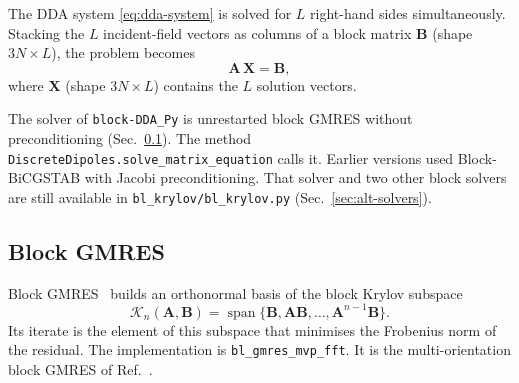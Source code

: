 \documentclass[11pt,a4paper]{article}
\begin{document}
The DDA system \eqref{eq:dda-system} is solved for $L$ right-hand sides
simultaneously.
Stacking the $L$ incident-field vectors as columns of a block matrix
$\mathbf{B}$ (shape $3N \times L$), the problem becomes
\begin{equation}
  \mathbf{A}\,\mathbf{X} = \mathbf{B},
  \label{eq:block-system}
\end{equation}
where $\mathbf{X}$ (shape $3N \times L$) contains the $L$ solution
vectors.

The solver of \texttt{block-DDA\_Py} is unrestarted block GMRES
without preconditioning (Sec.~\ref{sec:block-gmres}).
The method \texttt{DiscreteDipoles.solve\_matrix\_equation} calls it.
Earlier versions used Block-BiCGSTAB with Jacobi preconditioning.
That solver and two other block solvers are still available in
\texttt{bl\_krylov/bl\_krylov.py} (Sec.~\ref{sec:alt-solvers}).

\subsection{Block GMRES}
\label{sec:block-gmres}

Block GMRES~\cite{SaadSchultz1986,SimonciniGallopoulos1996} builds an
orthonormal basis of the block Krylov subspace
\begin{equation}
  \mathcal{K}_n(\mathbf{A}, \mathbf{B})
    = \operatorname{span}\{\mathbf{B}, \mathbf{A}\mathbf{B}, \ldots,
      \mathbf{A}^{n-1}\mathbf{B}\} .
  \label{eq:block-krylov-subspace}
\end{equation}
Its iterate is the element of this subspace that minimises the
Frobenius norm of the residual.
The implementation is \texttt{bl\_gmres\_mvp\_fft}.
It is the multi-orientation block GMRES of Ref.~\cite{Moteki2026}.
\end{document}
